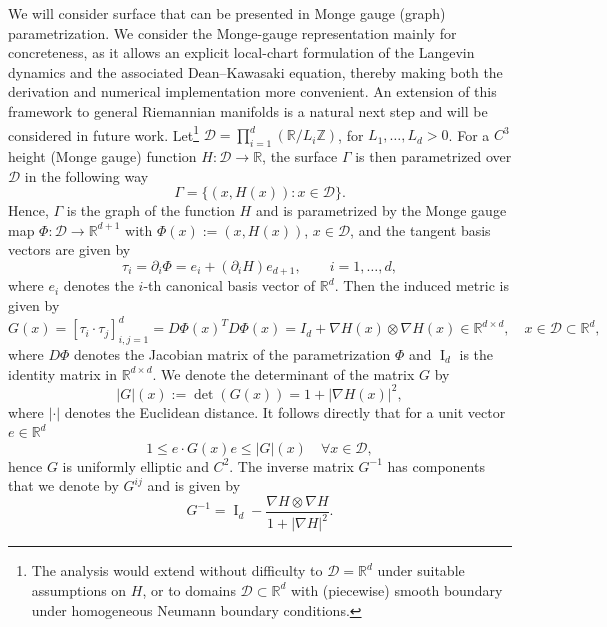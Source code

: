 \documentclass[11pt, a4paper]{article}
\newcommand{\tmop}[1]{\ensuremath{\operatorname{#1}}}
\begin{document}
We will consider surface that can be presented in Monge gauge (graph) parametrization. We consider the Monge-gauge representation mainly for concreteness, as it allows an explicit local-chart formulation of the Langevin dynamics and the associated Dean–Kawasaki equation, thereby making both the derivation and numerical implementation more convenient. An extension of this framework to general Riemannian manifolds is a natural next step and will be considered in future work. Let\footnote{The analysis would extend without difficulty to $\mathcal{D}=\mathbb R^d$ under suitable assumptions on $H$, or to domains $\mathcal{D} \subset \mathbb{R}^d$ with (piecewise) smooth boundary under homogeneous Neumann boundary conditions.}  $\mathcal{D}=\prod_{i=1}^d(\mathbb R/L_i\mathbb Z)$, for $L_1,\dots, L_d > 0$. For a $C^3$ height (Monge gauge) function $H: \mathcal{D}  \to \mathbb{R}$, the surface $\Gamma$ is then parametrized over $\mathcal{D}$ in the following way
\begin{equation*}
    \Gamma = \{ (x, H(x)) : x \in \mathcal{D}\}.
\end{equation*}
Hence, $\Gamma$ is the graph of the function $H$ and is parametrized by the Monge gauge map $\Phi:\mathcal{D} \to \mathbb{R}^{d+1}$ with  $\Phi(x):=(x,H(x))$, $x\in \mathcal{D}$, and the tangent basis vectors are given by
\begin{equation*}
    \tau_i = \partial_i \Phi = e_i + (\partial_i H) e_{d + 1}, \qquad i = 1,
   \ldots, d,
\end{equation*}
where $e_i$ denotes the $i$-th canonical basis vector of $\mathbb{R}^d$. Then the induced metric is given by
\begin{equation*}
     G (x)  = [\tau_i \cdot \tau_j]_{i,j=1}^d=D\Phi(x)^T D\Phi(x)=
I_d + \nabla H (x) \otimes \nabla H (x) \in
   \mathbb{R}^{d \times d},  \quad x \in \mathcal{D} \subset \mathbb{R}^d, 
\end{equation*}   
where $D \Phi$ denotes the Jacobian matrix of the parametrization $\Phi$ and  $\operatorname{I}_d$ is the identity matrix in $\mathbb{R}^{d\times d}$. %
We denote the determinant of the matrix $G$ by 
\begin{equation*}
    | G | (x) := \det (G(x))=
    1 + |\nabla H(x)|^2 ,
\end{equation*}
where $| \cdot |$ denotes the Euclidean distance. 
It follows directly that for a unit vector $e \in \mathbb{R}^d$ 
\[
1 \leq e \cdot G(x)e \leq |G|(x) \quad \forall x \in \mathcal{D}, 
\]
hence $G$ is uniformly elliptic and $C^2$. The inverse matrix $G^{-1}$ has components that we denote by $G^{ij}$ and is
given by
\[ G^{- 1} = \operatorname{I}_d - \frac{\nabla H \otimes \nabla H}{1 + | \nabla H |^2}.  \]
 
\end{document}
